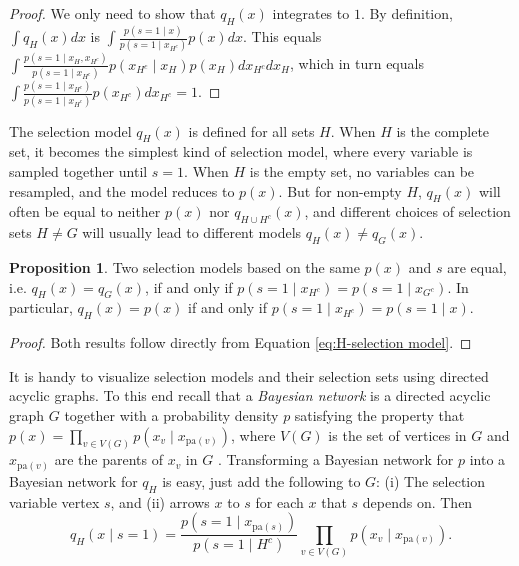 \documentclass[preprint, authoryear]{elsarticle}
\theoremstyle{plain}
\theoremstyle{definition}
\newtheorem{prop}[theorem]{Proposition}
\begin{document}
\begin{proof}
We only need to show that $q_{H}\left(x\right)$ integrates to $1$. By definition, $\int q_{H}\left(x\right)dx$ is $\int\frac{p\left(s=1\mid x\right)}{p\left(s=1\mid x_{H^{c}}\right)}p\left(x\right)dx.$ This equals $\int\frac{p\left(s=1\mid x_{H},x_{H^{c}}\right)}{p\left(s=1\mid x_{H^{c}}\right)}p\left(x_{H^{c}}\mid x_{H}\right)p\left(x_{H}\right)dx_{H^{c}}dx_{H}$,
which in turn equals $\int\frac{p\left(s=1\mid x_{H^{c}}\right)}{p\left(s=1\mid x_{H^{c}}\right)}p\left(x_{H^{c}}\right)dx_{H^{c}}=1$.
\end{proof}

The selection model $q_{H}(x)$ is defined for all sets $H$. When $H$ is the complete set, it becomes the simplest kind of selection model, where every variable is sampled together until $s=1$. When $H$ is the empty set, no variables can be resampled, and the model reduces to $p\left(x\right)$. But for non-empty $H$, $q_{H}(x)$ will often be equal to neither $p(x)$ nor $q_{H\cup H^c}(x)$, and different choices of selection sets $H\neq G$ will usually lead to different models $q_{H}(x)\neq q_{G}(x)$. 
\begin{prop}
\label{prop:Equal selection models}Two selection models based on the same $p(x)$ and $s$ are equal, i.e. $q_{H}(x)=q_{G}(x)$, if and only if $p\left(s=1\mid x_{H^{c}}\right)=p\left(s=1\mid x_{G^{c}}\right)$.
In particular, $q_{H}(x)=p(x)$ if and only if $p\left(s=1\mid x_{H^{c}}\right)=p\left(s=1\mid x\right)$.
\end{prop}

\begin{proof}
Both results follow directly from Equation \eqref{eq:H-selection model}.
\end{proof}

It is handy to visualize selection models and their selection sets using directed acyclic graphs. To this end recall that a \emph{Bayesian network} is a directed acyclic graph $G$ together with a probability
density $p$ satisfying the property that $p\left(x\right)=\prod_{v\in V\left(G\right)}p\left(x_{v}\mid x_{\textrm{pa}\left(v\right)}\right)$, where $V\left(G\right)$ is the set of vertices in $G$ and $x_{\textrm{pa}\left(v\right)}$ are the parents of $x_{v}$ in $G$ \citep{Pearl2014}.
Transforming a Bayesian network for $p$ into a Bayesian network for $q_{H}$ is easy, just add the following to $G$: (i) The selection variable vertex $s$, and (ii) arrows $x$ to $s$ for each $x$ that $s$ depends on. Then
\begin{equation}
q_{H}\left(x\mid s=1\right)=\frac{p\left(s=1\mid x_{\textrm{pa}\left(s\right)}\right)}{p\left(s=1\mid H^{c}\right)}\prod_{v\in V\left(G\right)}p\left(x_{v}\mid x_{\textrm{pa}\left(v\right)}\right)\label{eq:DAG, selection model}.
\end{equation}
\end{document}
